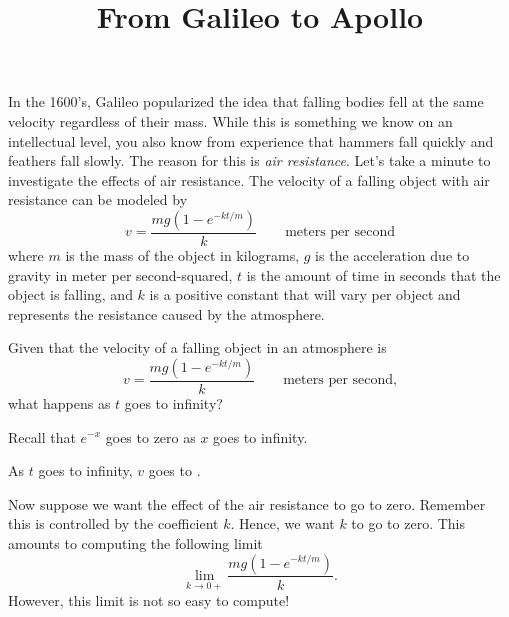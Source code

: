 \documentclass{ximera}
\title[Break-Ground:]{From Galileo to Apollo}
\begin{document}
\begin{abstract}

\end{abstract}
\maketitle



In the 1600's, Galileo popularized the idea that falling bodies fell
at the same velocity regardless of their mass. While this is something
we know on an intellectual level, you also know from experience that
hammers fall quickly and feathers fall slowly. The reason for this is
\textit{air resistance}.  Let's take a minute to investigate the
effects of air resistance. The velocity of a falling object with air
resistance can be modeled by
\[
v = \frac{mg(1-e^{-kt/m})}{k}\qquad\text{meters per second}
\]
where $m$ is the mass of the object in kilograms, $g$ is the
acceleration due to gravity in meter per second-squared, $t$ is the
amount of time in seconds that the object is falling, and $k$ is a
positive constant that will vary per object and represents the
resistance caused by the atmosphere.

\begin{problem}
Given that the velocity of a falling object in an atmosphere is 
\[
v = \frac{mg(1-e^{-kt/m})}{k}\qquad\text{meters per second,}
\]
what happens as $t$ goes to infinity?
\begin{hint}
Recall that $e^{-x}$ goes to zero as $x$ goes to infinity.
\end{hint}
\begin{prompt}
As $t$ goes to infinity, $v$ goes to .
\end{prompt}
\end{problem}


Now suppose we want the effect of the air resistance to go to
zero. Remember this is controlled by the coefficient $k$. Hence, we
want $k$ to go to zero. This amounts to computing the following limit
\[
\lim_{k\to 0+} \frac{mg(1-e^{-kt/m})}{k}.
\]
However, this limit is not so easy to compute!


\end{document}
